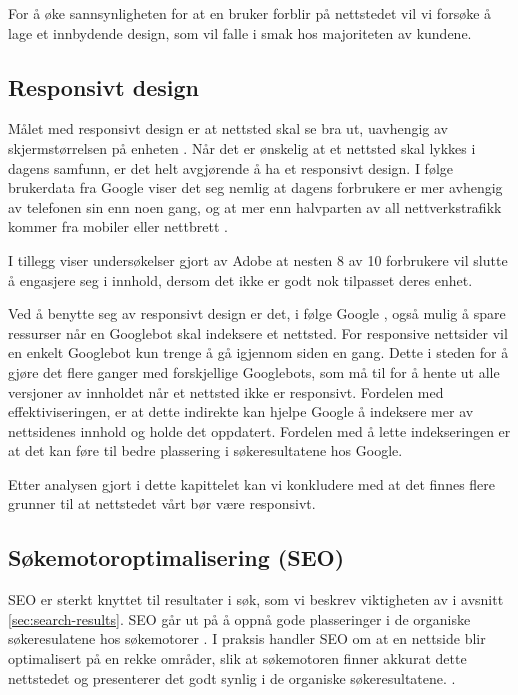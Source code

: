 For å øke sannsynligheten for at en bruker forblir på nettstedet vil vi forsøke å lage et innbydende design, som vil falle i smak hos majoriteten av kundene.

\subsection{Responsivt design}
Målet med responsivt design er at nettsted skal se bra ut, uavhengig av skjermstørrelsen på enheten \cite{kim2013rwd}. Når det er ønskelig at et nettsted skal lykkes i dagens samfunn, er det helt avgjørende å ha et responsivt design.  I følge brukerdata fra Google \cite{google16hms} viser det seg nemlig at dagens forbrukere er mer avhengig av telefonen sin enn noen gang, og at mer enn halvparten av all nettverkstrafikk kommer fra mobiler eller nettbrett . 

I tillegg viser undersøkelser gjort av Adobe \cite{stark2015frf} at nesten 8 av 10 forbrukere vil slutte å engasjere seg i innhold, dersom det ikke er godt nok tilpasset deres enhet.

Ved å benytte seg av responsivt design er det, i følge Google \cite{google2018rwd}, også mulig å spare ressurser når en Googlebot skal indeksere et nettsted. For responsive nettsider vil en enkelt Googlebot kun trenge å gå igjennom siden en gang. Dette i steden for å gjøre det flere ganger med forskjellige Googlebots, som må til for å hente ut alle versjoner av innholdet når et nettsted ikke er responsivt. Fordelen med effektiviseringen, er at dette indirekte kan hjelpe Google å indeksere mer av nettsidenes innhold og holde det oppdatert. Fordelen med å lette indekseringen er at det kan føre til bedre plassering i søkeresultatene hos Google.  

Etter analysen gjort i dette kapittelet kan vi konkludere med at det finnes flere grunner til at nettstedet vårt bør være responsivt.

\subsection{Søkemotoroptimalisering (SEO)}
\label{sec:concepts-seo}
SEO er sterkt knyttet til resultater i søk, som vi beskrev viktigheten av i avsnitt \ref{sec:search-results}. SEO går ut på å oppnå gode plasseringer i de organiske søkeresulatene hos søkemotorer \cite[s.~16]{flensted10smg}. I praksis handler SEO om at en nettside blir optimalisert på en rekke områder, slik at søkemotoren finner akkurat dette nettstedet og presenterer det godt synlig i de organiske søkeresultatene. \cite[s.~20]{flensted10smg}.

